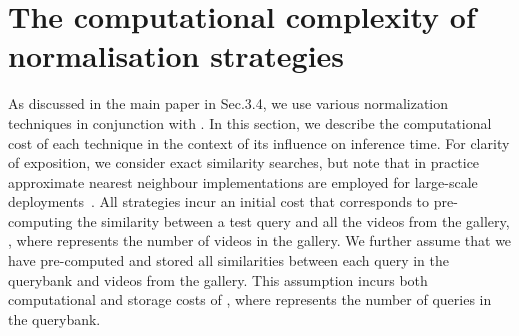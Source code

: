 \begin{table}
\begin{center}
\end{center}
\vspace{\spacebefore{}}
\caption{\textbf{ActivityNet: Comparison to state of the art methods}.\\ denotes results obtained training using the official code. \label{tab:activity-net-final-sota}}
\vspace{\spaceafter{}}
\end{table} 

\section{The computational complexity of normalisation strategies}
\label{sec:complexity}
As discussed in the main paper in Sec.3.4,
we use various normalization techniques in conjunction with \methodName.
In this section, we describe the computational cost of each technique
in the context of its influence on inference time.
For clarity of exposition,
we consider exact similarity searches,
but note that in practice approximate nearest neighbour implementations
are employed for large-scale deployments~\cite{johnson2019billion}.
All strategies incur an initial cost that corresponds to
pre-computing the similarity between a test query and
all the videos from the gallery,
,
where  represents the number of videos in the gallery.
We further assume that we have pre-computed and
stored all similarities between each query in the
querybank and videos from the gallery.
This assumption incurs both computational
and storage costs of
, where  represents the number of
queries in the querybank.

